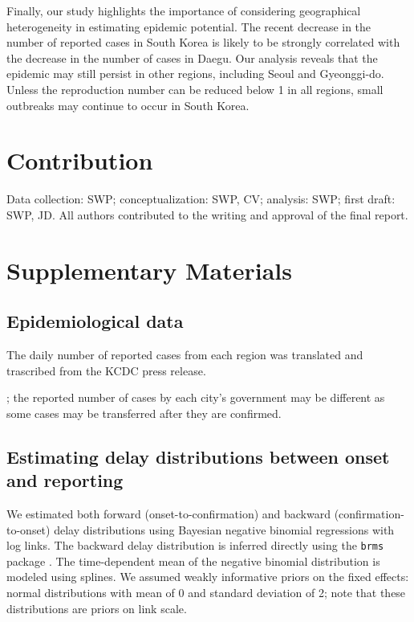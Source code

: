 \documentclass[12pt]{article}
\begin{document}
Finally, our study highlights the importance of considering geographical heterogeneity in estimating epidemic potential.
The recent decrease in the number of reported cases in South Korea is likely to be strongly correlated with the decrease in the number of cases in Daegu.
Our analysis reveals that the epidemic may still persist in other regions, including Seoul and Gyeonggi-do.
Unless the reproduction number can be reduced below 1 in all regions, small outbreaks may continue to occur in South Korea.

\section*{Contribution}

Data collection: SWP; conceptualization: SWP, CV; analysis: SWP; first draft: SWP, JD. All authors contributed to the writing and approval of the final report.

\pagebreak



\pagebreak

\renewcommand\thefigure{S\arabic{figure}}
\setcounter{figure}{0}    

\section*{Supplementary Materials}

\subsection*{Epidemiological data}

The daily number of reported cases from each region was translated and trascribed from the KCDC press release.

;
the reported number of cases by each city's government may be different as some cases may be transferred after they are confirmed.

\subsection*{Estimating delay distributions between onset and reporting}

We estimated both forward (onset-to-confirmation) and backward (confirmation-to-onset) delay distributions using Bayesian negative binomial regressions with log links.
The backward delay distribution is inferred directly using the \texttt{brms} package \citep{burkner2017brms}.
The time-dependent mean of the negative binomial distribution is modeled using splines.
We assumed weakly informative priors on the fixed effects: normal distributions with mean of 0 and standard deviation of 2;
note that these distributions are priors on link scale.
\end{document}
